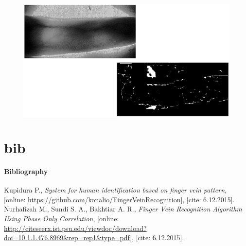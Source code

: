 \documentclass[compress]{beamer}
\begin{document}
\begin{frame}
\begin{figure}[ht!]
	\centering
	\includegraphics[width=13cm]{../fig/test_nas_pres.eps}
\end{figure}
\end{frame}



\part{bib}
\subsection{Bibliography}
\begin{frame}
\begin{thebibliography}{10}
	Kupidura P.,
	\emph{System for human identification based on finger vein pattern},
	[online: \url{https://github.com/konalio/FingerVeinRecognition}],
	[cite: 6.12.2015].
	Nurhafizah M., Sundi S. A., Bakhtiar A. R.,
		\emph{Finger Vein Recognition Algorithm Using Phase Only Correlation},
	[online: \url{http://citeseerx.ist.psu.edu/viewdoc/download?doi=10.1.1.476.8969&rep=rep1&type=pdf}],
	[cite: 6.12.2015].

\end{thebibliography}
\end{frame}
\end{document}
